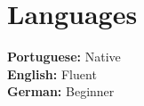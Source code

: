 \documentclass[letterpaper,11pt]{article}
\newcommand{\resumeSubHeadingListStart}{\begin{itemize}[leftmargin=0.15in, label={}]}
\newcommand{\resumeSubHeadingListEnd}{\end{itemize}}
\begin{document}
      


\section{Languages}
  \vspace{2pt}
  \resumeSubHeadingListStart
    \small{\item{
        \textbf{Portuguese: }{Native} \\ \vspace{3pt}
        \textbf{English: }{Fluent} \\ \vspace{3pt}
        \textbf{German: }{Beginner} \\ \vspace{3pt}
    }}
  \resumeSubHeadingListEnd

\end{document}
